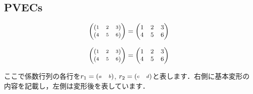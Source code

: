 \documentclass[../main]{subfiles}
\begin{document}
\leaderfill
\subsection{PVECs}

\[
    \PMAT{\PVECs{1&2&3}\\\PVECs{4&5&6}} = 
    \PMAT{1&2&3\\4&5&6}
\]
\begin{code}[language=tex]
\[
    \PMAT{\PVECs{1&2&3}\\\PVECs{4&5&6}} = 
    \PMAT{1&2&3\\4&5&6}
\]
\end{code}

\leaderfill

ここで係数行列の各行を$r_1 = \PVECs{a&b}$, $r_2 = \PVECs{c&d}$と表します．右側に基本変形の内容を記載し，左側は変形後を表しています．
\end{document}
